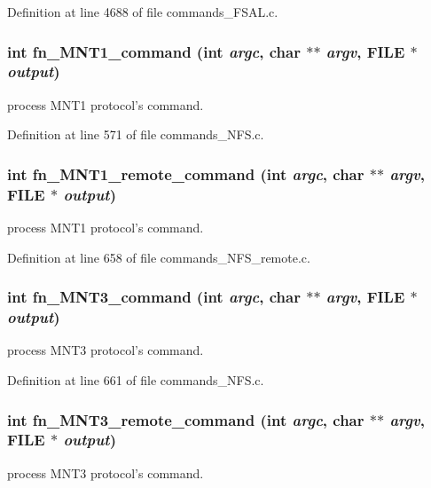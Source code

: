 Definition at line 4688 of file commands\_\-FSAL.c.
\subsubsection[{fn\_\-MNT1\_\-command}]{\setlength{\rightskip}{0pt plus 5cm}int fn\_\-MNT1\_\-command (int {\em argc}, \/  char $\ast$$\ast$ {\em argv}, \/  FILE $\ast$ {\em output})}\label{commands_8h_ad9e57b227010916f9c9168a00b14c1ed}
process MNT1 protocol's command. 

Definition at line 571 of file commands\_\-NFS.c.
\subsubsection[{fn\_\-MNT1\_\-remote\_\-command}]{\setlength{\rightskip}{0pt plus 5cm}int fn\_\-MNT1\_\-remote\_\-command (int {\em argc}, \/  char $\ast$$\ast$ {\em argv}, \/  FILE $\ast$ {\em output})}\label{commands_8h_a1677ca6949081f0d97593268114459a1}
process MNT1 protocol's command. 

Definition at line 658 of file commands\_\-NFS\_\-remote.c.
\subsubsection[{fn\_\-MNT3\_\-command}]{\setlength{\rightskip}{0pt plus 5cm}int fn\_\-MNT3\_\-command (int {\em argc}, \/  char $\ast$$\ast$ {\em argv}, \/  FILE $\ast$ {\em output})}\label{commands_8h_afcb010876c8c82ba28498eff4e33466a}
process MNT3 protocol's command. 

Definition at line 661 of file commands\_\-NFS.c.
\subsubsection[{fn\_\-MNT3\_\-remote\_\-command}]{\setlength{\rightskip}{0pt plus 5cm}int fn\_\-MNT3\_\-remote\_\-command (int {\em argc}, \/  char $\ast$$\ast$ {\em argv}, \/  FILE $\ast$ {\em output})}\label{commands_8h_a7d8f2c4570bef1373bc94247b00a753e}
process MNT3 protocol's command. 

